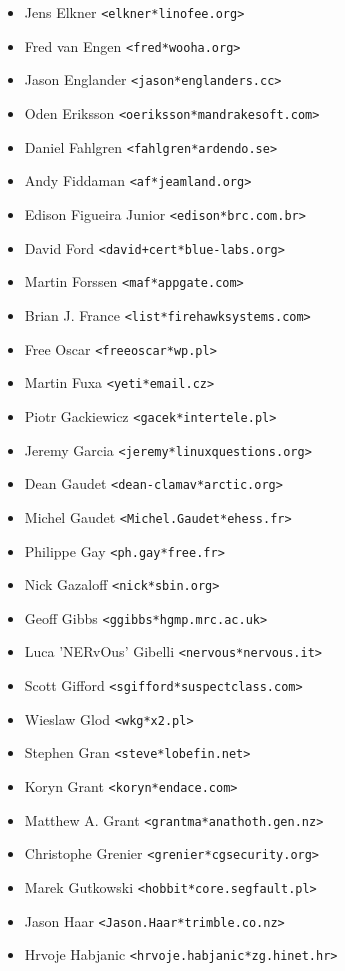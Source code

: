 \documentclass[a4paper,titlepage,12pt]{article}
\newcommand{\email}[1]{\texttt{#1}}
\begin{document}
\begin{itemize}
	\item Jens Elkner \email{<elkner*linofee.org>}
	\item Fred van Engen \email{<fred*wooha.org>}
	\item Jason Englander \email{<jason*englanders.cc>}
	\item Oden Eriksson \email{<oeriksson*mandrakesoft.com>}
	\item Daniel Fahlgren \email{<fahlgren*ardendo.se>}
	\item Andy Fiddaman \email{<af*jeamland.org>}
	\item Edison Figueira Junior \email{<edison*brc.com.br>}
	\item David Ford \email{<david+cert*blue-labs.org>}
	\item Martin Forssen \email{<maf*appgate.com>}
	\item Brian J. France \email{<list*firehawksystems.com>}
	\item Free Oscar \email{<freeoscar*wp.pl>}
	\item Martin Fuxa \email{<yeti*email.cz>}
	\item Piotr Gackiewicz \email{<gacek*intertele.pl>}
	\item Jeremy Garcia \email{<jeremy*linuxquestions.org>}
	\item Dean Gaudet \email{<dean-clamav*arctic.org>}
	\item Michel Gaudet \email{<Michel.Gaudet*ehess.fr>}
	\item Philippe Gay \email{<ph.gay*free.fr>}
	\item Nick Gazaloff \email{<nick*sbin.org>}
	\item Geoff Gibbs \email{<ggibbs*hgmp.mrc.ac.uk>}
	\item Luca 'NERvOus' Gibelli \email{<nervous*nervous.it>}
	\item Scott Gifford \email{<sgifford*suspectclass.com>}
	\item Wieslaw Glod \email{<wkg*x2.pl>}
	\item Stephen Gran \email{<steve*lobefin.net>}
	\item Koryn Grant \email{<koryn*endace.com>}
	\item Matthew A. Grant \email{<grantma*anathoth.gen.nz>}
	\item Christophe Grenier \email{<grenier*cgsecurity.org>}
	\item Marek Gutkowski \email{<hobbit*core.segfault.pl>}
	\item Jason Haar \email{<Jason.Haar*trimble.co.nz>}
	\item Hrvoje Habjanic \email{<hrvoje.habjanic*zg.hinet.hr>}

\end{itemize}
\end{document}
